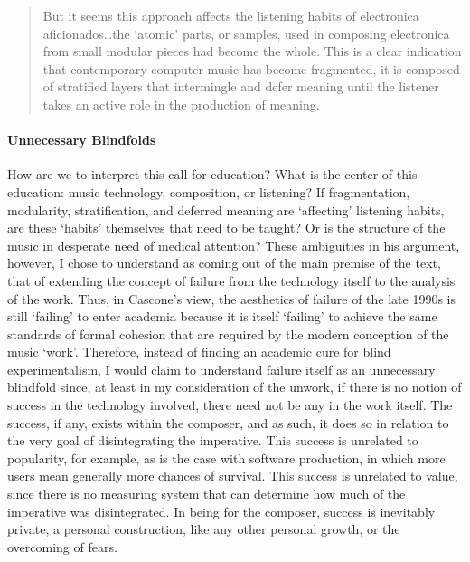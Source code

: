\begin{quote}
	But it seems this approach affects the listening habits of electronica aficionados\dots the `atomic' parts, or samples, used in composing electronica from small modular pieces had become the whole. This is a clear indication that contemporary computer music has become fragmented, it is composed of stratified layers that intermingle and defer meaning until the listener takes an active role in the production of meaning. \parencite[17]{Cas00:The}
\end{quote}

\paragraph{Unnecessary Blindfolds}
How are we to interpret this call for education? What is the center of this education: music technology, composition, or listening? If fragmentation, modularity, stratification, and deferred meaning are `affecting' listening habits, are these `habits' themselves that need to be taught? Or is the structure of the music in desperate need of medical attention? These ambiguities in his argument, however, I chose to understand as coming out of the main premise of the text, that of extending the concept of failure from the technology itself to the analysis of the work. Thus, in Cascone's view, the aesthetics of failure of the late 1990s is still `failing' to enter academia because it is itself `failing' to achieve the same standards of formal cohesion that are required by the modern conception of the music `work'. Therefore, instead of finding an academic cure for blind experimentalism, I would claim to understand failure itself as an unnecessary blindfold since, at least in my consideration of the unwork, if there is no notion of success in the technology involved, there need not be any in the work itself. The success, if any, exists within the composer, and as such, it does so in relation to the very goal of disintegrating the imperative. This success is unrelated to popularity, for example, as is the case with software production, in which more users mean generally more chances of survival. This success is unrelated to value, since there is no measuring system that can determine how much of the imperative was disintegrated. In being for the composer, success is inevitably private, a personal construction, like any other personal growth, or the overcoming of fears.

